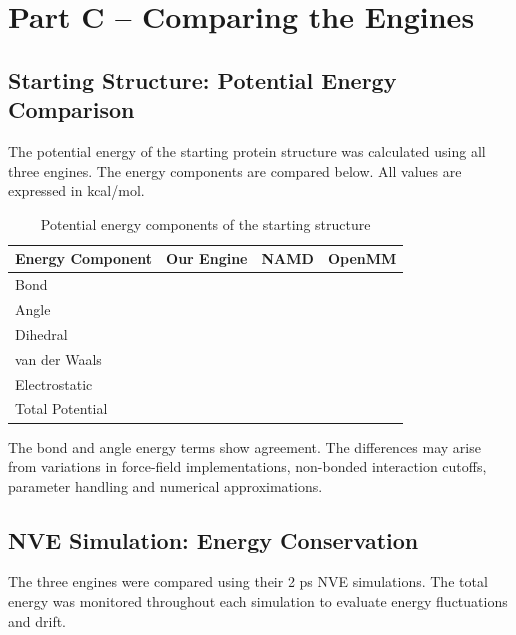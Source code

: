 \documentclass[11pt, a4paper]{article}
\begin{document}
\section{Part C -- Comparing the Engines}

\subsection{Starting Structure: Potential Energy Comparison}

The potential energy of the starting protein structure was calculated
using all three engines. The energy components are compared below.
All values are expressed in kcal/mol.

\begin{table}[h]
    \centering
    \caption{Potential energy components of the starting structure}
    \begin{tabular}{lrrr}
        \hline
        \textbf{Energy Component} &
        \textbf{Our Engine} &
        \textbf{NAMD} &
        \textbf{OpenMM} \\
        \hline
        Bond             &  &  &  \\
        Angle            &  &  &  \\
        Dihedral         &  &  &  \\
        van der Waals    &  &  &  \\
        Electrostatic    &  &  &  \\
        \hline
        Total Potential  & & & \\
        \hline
    \end{tabular}
    \label{tab:potential_energy}
\end{table}

The bond and angle energy terms show agreement. The differences may arise
from variations in force-field implementations, non-bonded interaction
cutoffs, parameter handling and numerical approximations.

\subsection{NVE Simulation: Energy Conservation}

The three engines were compared using their 2 ps NVE simulations.
The total energy was monitored throughout each simulation to evaluate
energy fluctuations and drift.
\end{document}
